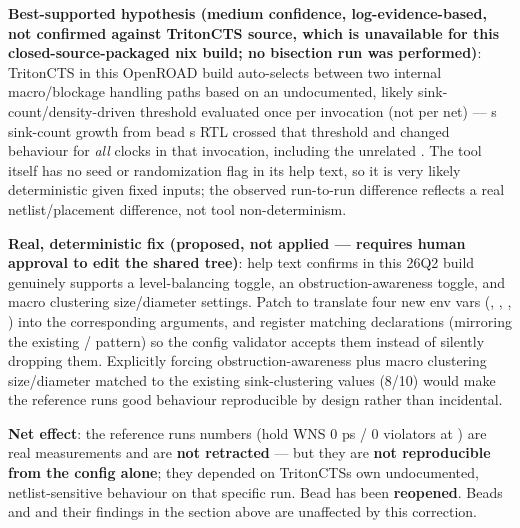 \begin{record}
\textbf{Best-supported hypothesis (medium confidence,
log-evidence-based, not confirmed against TritonCTS source, which is
unavailable for this closed-source-packaged nix build; no bisection run
was performed)}: TritonCTS in this OpenROAD build auto-selects between
two internal macro/\allowbreak{}blockage handling paths based on an
undocumented, likely sink-count/\allowbreak{}density-driven threshold
evaluated once per  invocation (not per net)
--- \textquotesingle s sink-count growth from bead
\textquotesingle s RTL crossed that threshold and changed
behaviour for \emph{all} clocks in that invocation, including the
unrelated . The tool itself has no seed or randomization
flag in its help text, so it is very likely deterministic given fixed
inputs; the observed run-to-run difference reflects a real
netlist/\allowbreak{}placement difference, not tool non-determinism.

\textbf{Real, deterministic fix (proposed, not applied --- requires
human approval to edit the shared  tree)}:
 help text confirms  in this
26Q2 build genuinely supports a level-balancing toggle, an
obstruction-awareness toggle, and macro clustering
size/\allowbreak{}diameter settings. Patch  to translate
four new env vars (,
, ,
) into the corresponding
 arguments, and register matching
 declarations (mirroring the existing
/
pattern) so the config validator accepts them instead of silently
dropping them. Explicitly forcing obstruction-awareness plus macro
clustering size/\allowbreak{}diameter matched to the existing
sink-clustering values (8/10) would make the reference
run\textquotesingle s good behaviour reproducible by design rather than
incidental.

\textbf{Net effect}: the reference run\textquotesingle s numbers (hold
WNS 0 ps / 0 violators at ) are real measurements and
are \textbf{not retracted} --- but they are \textbf{not reproducible
from the config alone}; they depended on TritonCTS\textquotesingle s own
undocumented, netlist-sensitive behaviour on that specific run. Bead
 has been \textbf{reopened}. Beads  and 
and their findings in the section above are unaffected by this
correction.

\end{record}

